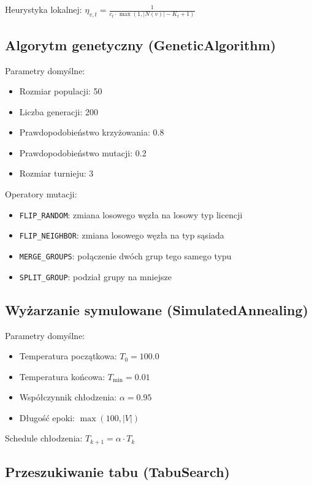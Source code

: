 Heurystyka lokalnej: $\eta_{v,t} = \frac{1}{c_t \cdot \max(1, |N(v)| - K_t + 1)}$

\subsection{Algorytm genetyczny (GeneticAlgorithm)}

Parametry domyślne:
\begin{itemize}
\item Rozmiar populacji: 50
\item Liczba generacji: 200
\item Prawdopodobieństwo krzyżowania: 0.8
\item Prawdopodobieństwo mutacji: 0.2
\item Rozmiar turnieju: 3
\end{itemize}

Operatory mutacji:
\begin{itemize}
\item \texttt{FLIP\_RANDOM}: zmiana losowego węzła na losowy typ licencji
\item \texttt{FLIP\_NEIGHBOR}: zmiana losowego węzła na typ sąsiada
\item \texttt{MERGE\_GROUPS}: połączenie dwóch grup tego samego typu
\item \texttt{SPLIT\_GROUP}: podział grupy na mniejsze
\end{itemize}

\subsection{Wyżarzanie symulowane (SimulatedAnnealing)}

Parametry domyślne:
\begin{itemize}
\item Temperatura początkowa: $T_0 = 100.0$
\item Temperatura końcowa: $T_{\text{min}} = 0.01$
\item Współczynnik chłodzenia: $\alpha = 0.95$
\item Długość epoki: $\max(100, |V|)$
\end{itemize}

Schedule chłodzenia: $T_{k+1} = \alpha \cdot T_k$

\subsection{Przeszukiwanie tabu (TabuSearch)}

